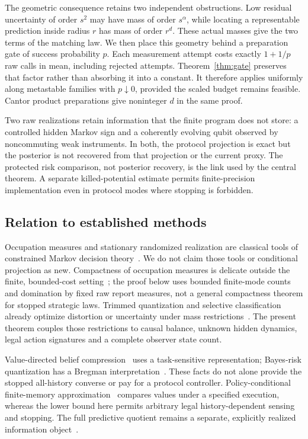 The geometric consequence retains two independent obstructions. Low residual uncertainty of order $s^2$ may have mass of order $s^\alpha$, while locating a representable prediction inside radius $r$ has mass of order $r^d$. These actual masses give the two terms of the matching law. We then place this geometry behind a preparation gate of success probability $p$. Each measurement attempt costs exactly $1+1/p$ raw calls in mean, including rejected attempts. Theorem~\ref{thm:gate} preserves that factor rather than absorbing it into a constant. It therefore applies uniformly along metastable families with $p\downarrow0$, provided the scaled budget remains feasible. Cantor product preparations give noninteger $d$ in the same proof.

Two raw realizations retain information that the finite program does not store: a controlled hidden Markov sign and a coherently evolving qubit observed by noncommuting weak instruments. In both, the protocol projection is exact but the posterior is not recovered from that projection or the current proxy. The protected risk comparison, not posterior recovery, is the link used by the central theorem. A separate killed-potential estimate permits finite-precision implementation even in protocol modes where stopping is forbidden.

\subsection*{Relation to established methods}
Occupation measures and stationary randomized realization are classical tools of constrained Markov decision theory~\cite{Altman,DP}. We do not claim those tools or conditional projection as new. Compactness of occupation measures is delicate outside the finite, bounded-cost setting~\cite{PZ}; the proof below uses bounded finite-mode counts and domination by fixed raw report measures, not a general compactness theorem for stopped strategic laws. Trimmed quantization and selective classification already optimize distortion or uncertainty under mass restrictions~\cite{CGM,Franc}. The present theorem couples those restrictions to causal balance, unknown hidden dynamics, legal action signatures and a complete observer state count.

Value-directed belief compression~\cite{PB} uses a task-sensitive representation; Bayes-risk quantization has a Bregman interpretation~\cite{Varshney}. These facts do not alone provide the stopped all-history converse or pay for a protocol controller. Policy-conditional finite-memory approximation~\cite{Kim} compares values under a specified execution, whereas the lower bound here permits arbitrary legal history-dependent sensing and stopping. The full predictive quotient remains a separate, explicitly realized information object~\cite{SC}.

